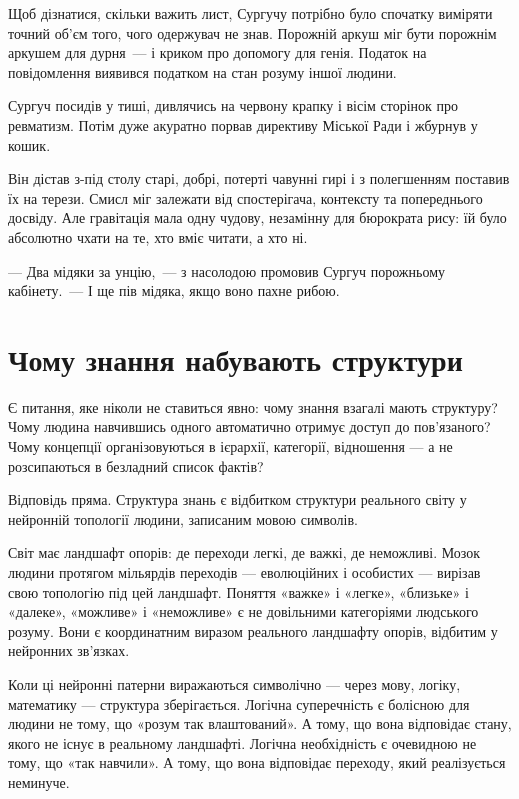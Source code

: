 \documentclass[12pt, a4paper, openany]{book}
\begin{document}
\begin{terrybox}
Щоб дізнатися, скільки важить лист, Сургучу потрібно було спочатку виміряти точний об'єм того, чого одержувач не знав. Порожній аркуш міг бути порожнім аркушем для дурня~--- і криком про допомогу для генія. Податок на повідомлення виявився податком на стан розуму іншої людини.

Сургуч посидів у тиші, дивлячись на червону крапку і вісім сторінок про ревматизм. Потім дуже акуратно порвав директиву Міської Ради і жбурнув у кошик.

Він дістав з-під столу старі, добрі, потерті чавунні гирі і з полегшенням поставив їх на терези. Смисл міг залежати від спостерігача, контексту та попереднього досвіду. Але гравітація мала одну чудову, незамінну для бюрократа рису: їй було абсолютно чхати на те, хто вміє читати, а хто ні.

--- Два мідяки за унцію,~--- з насолодою промовив Сургуч порожньому кабінету.~--- І ще пів мідяка, якщо воно пахне рибою.
\end{terrybox}

\section{Чому знання набувають структури}

Є питання, яке ніколи не ставиться явно: чому знання взагалі мають структуру? Чому людина навчившись одного автоматично отримує доступ до пов'язаного? Чому концепції організовуються в ієрархії, категорії, відношення — а не розсипаються в безладний список фактів?

Відповідь пряма. Структура знань є відбитком структури реального світу у нейронній топології людини, записаним мовою символів.

Світ має ландшафт опорів: де переходи легкі, де важкі, де неможливі. Мозок людини протягом мільярдів переходів — еволюційних і особистих — вирізав свою топологію під цей ландшафт. Поняття «важке» і «легке», «близьке» і «далеке», «можливе» і «неможливе» є не довільними категоріями людського розуму. Вони є координатним виразом реального ландшафту опорів, відбитим у нейронних зв'язках.

Коли ці нейронні патерни виражаються символічно — через мову, логіку, математику — структура зберігається. Логічна суперечність є болісною для людини не тому, що «розум так влаштований». А тому, що вона відповідає стану, якого не існує в реальному ландшафті. Логічна необхідність є очевидною не тому, що «так навчили». А тому, що вона відповідає переходу, який реалізується неминуче.
\end{document}

